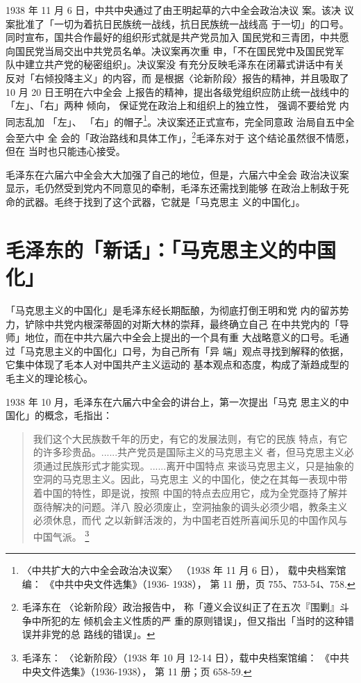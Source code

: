 1938 年 11 月 6 日，中共中央通过了由王明起草的六中全会政治决议 案。该决
议案批准了「一切为着抗日民族统一战线，抗日民族统一战线高 于一切」的口号。
同时宣布，国共合作最好的组织形式就是共产党员加入 国民党和三青团，中共愿
向国民党当局交出中共党员名单。决议案再次重 申，「不在国民党中及国民党军
队中建立共产党的秘密组织」。决议案没 有充分反映毛泽东在闭幕式讲话中有关
反对「右倾投降主义」的内容，而 是根据〈论新阶段〉报告的精神，并且吸取了
10 月 20 日王明在六中全会 上报告的精神，提出各级党组织应防止统一战线中的
「左」、「右」两种 倾向， 保证党在政治上和组织上的独立性， 强调不要给党
内同志乱加 「左」、 「右」的帽子\footnote{〈中共扩大的六中全会政治决议案〉
（1938 年 11 月 6 日）， 载中央档案馆编：  《中共中央文件选集》（1936-
1938）， 第 11 册，页 755、753-54、758.}。决议案还正式宣布，完全同意政
治局自五中全 会至六中 全 会的「政治路线和具体工作」，\footnote{毛泽东在
〈论新阶段〉政治报告中， 称「遵义会议纠正了在五次『围剿』斗争中所犯的左
倾机会主义性质的严 重的原则错误」，但又指出「当时的这种错误并非党的总
路线的错误」。}毛泽东对于 这个结论虽然很不情愿，但在 当时也只能违心接受。

毛泽东在六届六中全会大大加强了自己的地位，但是，六届六中全会
政治决议案显示，毛仍然受到党内不同意见的牵制，毛泽东还需找到能够
在政治上制敌于死命的武器。毛终于找到了这个武器，它就是「马克思主
义的中国化」。

\section{毛泽东的「新话」：「马克思主义的中国化」}

「马克思主义的中国化」是毛泽东经长期酝酿，为彻底打倒王明和党
内的留苏势力，铲除中共党内根深蒂固的对斯大林的崇拜，最终确立自己
在中共党内的「导师」地位，而在中共六届六中全会上提出的一个具有重
大战略意义的口号。毛通过「马克思主义的中国化」口号，为自己所有「异
端」观点寻找到解释的依据，它集中体现了毛本人对中国共产主义运动的
基本观点和态度，构成了渐趋成型的毛主义的理论核心。
 
1938 年 10 月，毛泽东在六届六中全会的讲台上，第一次提出「马克
思主义的中国化」的概念，毛指出：
\begin{quote}
	\fzwkai 我们这个大民族数千年的历史，有它的发展法则，有它的民族
特点，有它的许多珍贵品。......共产党员是国际主义的马克思主义
者，但马克思主义必须通过民族形式才能实现。......离开中国特点
来谈马克思主义，只是抽象的空洞的马克思主义。因此，马克思主
义的中国化，使之在其每一表现中带着中国的特性，即是说，按照
中国的特点去应用它，成为全党亟持了解并亟待解决的问题。洋八
股必须废止，空洞抽象的调头必须少唱，教条主义必须休息，而代
之以新鲜活泼的，为中国老百姓所喜闻乐见的中国作风与中国气派。
\footnote{毛泽东： 〈论新阶段〉（1938
年 10 月 12-14 日），载中央档案馆编： 《中共中央文件选集》（1936-1938），
第 11 册；页 658-59.}
\end{quote}


